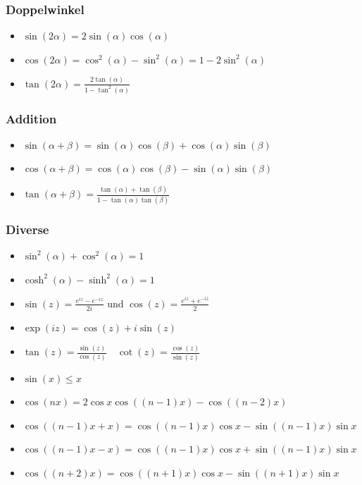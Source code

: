 \documentclass[a4paper,10pt]{article}
\begin{document}
				\subsubsection{Doppelwinkel}
				\begin{itemize}
					\item $\sin(2\alpha) = 2 \sin(\alpha) \cos(\alpha)$
					\item $\cos(2\alpha) = \cos^2(\alpha) - \sin^2(\alpha) = 1 - 2 \sin^2(\alpha)$
					\item $\tan(2\alpha) = \frac{2\tan(\alpha)}{1 - \tan^2(\alpha)}$
				\end{itemize}
				
				\subsubsection{Addition}
				\begin{itemize}
					\item $\sin(\alpha + \beta) = \sin(\alpha) \cos(\beta) + \cos(\alpha) \sin(\beta)$
					\item $\cos(\alpha + \beta) = \cos(\alpha) \cos(\beta) - \sin(\alpha) \sin(\beta)$
					\item $\tan(\alpha + \beta) = \frac{\tan(\alpha) + \tan(\beta)}{1 - \tan(\alpha) \tan(\beta)}$
				\end{itemize}
				
				\subsubsection{Diverse}
				
				\begin{itemize}
					\item $\sin^2(\alpha) + \cos^2(\alpha) = 1$
					\item $\cosh^2(\alpha) - \sinh^2(\alpha) = 1$
					\item $\sin(z) = \frac{e^{iz} - e^{-iz}}{2i}$ und $\cos(z) = \frac{e^{iz} + e^{-iz}}{2}$
					\item $\exp (iz) = \cos(z) + i \sin(z)$
					\item $\tan(z)=\frac{\sin(z)}{\cos(z)}\quad \cot(z)=\frac{\cos(z)}{\sin(z)}$
					\item $\sin(x)\leq x$
					\item ${\displaystyle \cos(nx)=2\cos x\cos((n-1)x)-\cos((n-2)x)}$
					\item ${\displaystyle \cos((n-1)x+x)=\cos((n-1)x)\cos x-\sin((n-1)x)\sin x}$
					\item ${\displaystyle \cos((n-1)x-x)=\cos((n-1)x)\cos x+\sin((n-1)x)\sin x}$
					\item ${\displaystyle \cos((n+2)x)=\cos((n+1)x)\cos x-\sin((n+1)x)\sin x}$
				\end{itemize}
				
\end{document}
